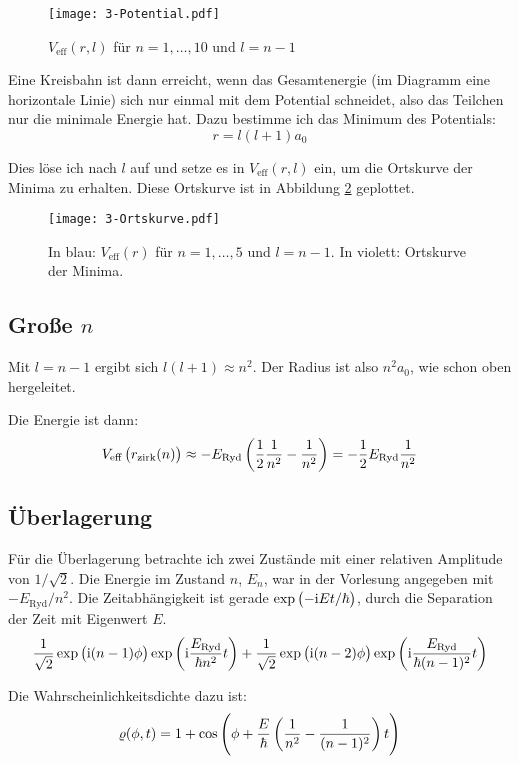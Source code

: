 \begin{figure}
	\centering
	\texttt{[image: 3-Potential.pdf]}
	\caption{$V_\text{eff}(r, l)$ für $n = 1, \ldots, 10$ und $l = n - 1$}
	\label{fig:1}
\end{figure}

Eine Kreisbahn ist dann erreicht, wenn das Gesamtenergie (im Diagramm eine
horizontale Linie) sich nur einmal mit dem Potential schneidet, also das
Teilchen nur die minimale Energie hat. Dazu bestimme ich das Minimum des
Potentials:
\[
	r = l(l+1) a_0
\]

Dies löse ich nach $l$ auf und setze es in $V_\text{eff}(r, l)$ ein, um die
Ortskurve der Minima zu erhalten. Diese Ortskurve ist in Abbildung \ref{fig:2}
geplottet.

\begin{figure}
	\centering
	\texttt{[image: 3-Ortskurve.pdf]}
	\caption{%
		In blau: $V_\text{eff}(r)$ für $n = 1, \ldots, 5$ und $l = n - 1$. In
		violett: Ortskurve der Minima.
	}
	\label{fig:2}
\end{figure}

\subsection{Große $n$}

Mit $l = n - 1$ ergibt sich $l(l+1) \approx n^2$. Der Radius ist also $n^2 a_0$, wie schon oben hergeleitet.

Die Energie ist dann:
\[
	V_\text{eff}\del{r_\text{zirk}(n)}
	\approx - E_\text{Ryd} \del{\half \frac1{n^2} - \frac1{n^2}}
	= - \half E_\text{Ryd} \frac1{n^2}
\]

\subsection{Überlagerung}

Für die Überlagerung betrachte ich zwei Zustände mit einer relativen Amplitude
von $1/\sqrt2$. Die Energie im Zustand $n$, $E_n$, war in der Vorlesung
angegeben mit $-E_\text{Ryd}/n^2$. Die Zeitabhängigkeit ist gerade
$\exp\del{-\ii Et/\hbar}$, durch die Separation der Zeit mit Eigenwert $E$.
\[
	\frac1{\sqrt2} \exp\del{\ii (n-1) \phi} \exp\del{\ii \frac{E_\text{Ryd}}{\hbar n^2} t}
	+
	\frac1{\sqrt2} \exp\del{\ii (n-2) \phi} \exp\del{\ii \frac{E_\text{Ryd}}{\hbar (n-1)^2} t}
\]

Die Wahrscheinlichkeitsdichte dazu ist:
\[
	\varrho(\phi, t)
	= 1 + \cos\del{\phi + \frac{E}\hbar \del{\frac1{n^2} - \frac1{(n-1)^2}}t}
\]


